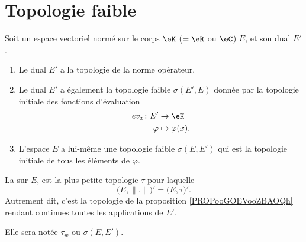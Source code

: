 


\section{Topologie faible}



\begin{definition}        \label{DEFooZGLDooRRarRj}
	Soit un espace vectoriel normé sur le corps \( \eK\) (\( =\eR\) ou \( \eC\)) \( E\), et son dual \( E'\).
	\begin{enumerate}
		\item
		      Le dual \( E'\) a la topologie de la norme opérateur.
		\item		\label{ITEMooBTIQooTQrtWt}
		      Le dual \( E'\) a également la topologie faible \( \sigma(E',E)\) donnée par la topologie initiale des fonctions d'évaluation
		      \begin{equation}		\label{EQooGGDFooSIwGGq}
			      \begin{aligned}
				      ev_x\colon E' & \to \eK             \\
				      \varphi       & \mapsto \varphi(x).
			      \end{aligned}
		      \end{equation}
		\item
		      L'espace \( E\) a lui-même une topologie faible \( \sigma(E,E')\) qui est la topologie initiale de tous les éléments de \( \varphi\).
	\end{enumerate}


	La  sur \( E\), est la plus petite topologie \( \tau\) pour laquelle
	\begin{equation}
		\big( E,\| . \| \big)'=\big( E,\tau \big)'.
	\end{equation}
	Autrement dit, c'est la topologie de la proposition \ref{PROPooGOEVooZBAOQh} rendant continues toutes les applications de \( E'\).

	Elle sera notée \( \tau_w\) ou \( \sigma(E,E')\).
\end{definition}

